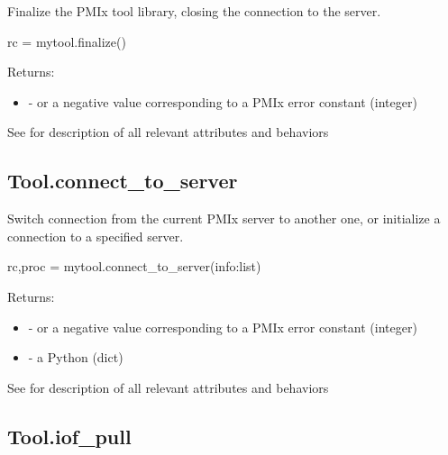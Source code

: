\summary Finalize the PMIx tool library, closing the connection to the server.

\format

\pyspecificstart
\begin{codepar}
rc = mytool.finalize()
\end{codepar}
\pyspecificend


Returns:

\begin{itemize}
    \item {} -  or a negative value corresponding to a PMIx error constant (integer)
\end{itemize}


See  for description of all relevant attributes and behaviors


\subsection{Tool.connect_to_server}

\summary
Switch connection from the current \ac{PMIx} server to another one, or initialize a connection to a specified server.


\format

\pyspecificstart
\begin{codepar}
rc,proc = mytool.connect_to_server(info:list)
\end{codepar}
\pyspecificend


\begin{arglist}
\end{arglist}

Returns:

\begin{itemize}
    \item {} -  or a negative value corresponding to a PMIx error constant (integer)
    \item {} - a Python  (dict)
\end{itemize}


See  for description of all relevant attributes and behaviors


\subsection{Tool.iof_pull}

